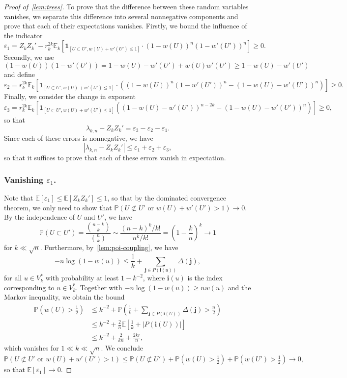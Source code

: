 \documentclass[11pt]{article}
\theoremstyle{definition}
\theoremstyle{remark}
\theoremstyle{remark}
\numberwithin{theorem}{section}
\providecommand{\P}{}
\renewcommand{\P}{\mathbb{P}}
\newcommand{\E}{\mathbb{E}}
\newcommand{\I}[1]{{\mathbf 1}_{[#1]}}
\begin{document}
\begin{proof}[Proof of~\cref{lem:trees}]
    To prove that the difference between these random variables vanishes, we separate this difference into several nonnegative components and prove that each of their expectations vanishes.
    Firstly, we bound the influence of the indicator
    \[
    \varepsilon_1=Z_kZ_k'-r_k^{2k}\E_k[\I{U\subset U',w(U)+w'(U')\le1}\cdot\left(1-w(U)\right)^n\left(1-w'(U')\right)^n]\ge0.
    \] 
    Secondly, we use \[(1-w(U))(1-w'(U'))=1-w(U)-w'(U')+w(U)w'(U')\ge1-w(U)-w'(U')\]
    and define
    \[
    \varepsilon_2=r_k^{2k}\E_k\left[\I{U\subset U',w(U)+w'(U')\le1}\cdot\left(\left(1-w(U)\right)^n\left(1-w'(U')\right)^n-\left(1-w(U)-w'(U')\right)^n\right)\right]\ge0.
    \]
    Finally, we consider the change in exponent
    \[
    \varepsilon_3=r_k^{2k}\E_k\left[\I{U\subset U',w(U)+w'(U')\le1}\left(\left(1-w(U)-w'(U')\right)^{n-2k}-\left(1-w(U)-w'(U')\right)^n\right)\right]\ge0,
    \]
    so that
    \[
    \lambda_{k,n}-Z_kZ_k'=\varepsilon_3-\varepsilon_2-\varepsilon_1.
    \]
    Since each of these errors is nonnegative, we have
    \[
    |\lambda_{k,n}-Z_kZ_k'|\le\varepsilon_1+\varepsilon_2+\varepsilon_3,
    \]
    so that it suffices to prove that each of these errors vanish in expectation.

    \subsubsection*{Vanishing $\varepsilon_1$.} 
    Note that $\E[\varepsilon_1]\le\E[Z_kZ_k']\le1$, so that by the dominated convergence theorem, we only need to show that $\P(U\not\subset U'\text{ or }w(U)+w'(U')>1)\to0$.
    By the independence of $U$ and $U'$, we have
    \[
        \P(U\subset U')=\frac{{n-k\choose k}}{{n\choose k}}\sim \frac{(n-k)^k/k!}{n^k/k!}=\left(1-\frac kn\right)^{k}\to1
    \]
    for $k\ll\sqrt{n}$.
    Furthermore, by~\cref{lem:poi-coupling}, we have
    \[
    -n\log(1-w(u))\le \frac1k+\sum_{\bm j\in P(\bm i(u))}\Delta(\bm j),
    \]
    for all $u\in V_k^*$ with probability at least $1-k^{-2}$, where $\bm i(u)$ is the index corresponding to $u\in V_k^*$. Together with $-n\log(1-w(u))\ge nw(u)$ and the Markov inequality, we obtain the bound
    \begin{align*}
    \P(w(U)>\tfrac12)&\le k^{-2}+\P\left(\frac1k+\sum_{\bm j\in P(\bm i(U))}\Delta(\bm j)>\frac n2\right)\\
    &\le k^{-2}+\frac2n\E\left[\frac1k+|P(\bm i(U))|\right]\\
    &\le k^{-2}+\frac2{kn}+\frac{2kr}n,
    \end{align*}
    which vanishes for $1\ll k\ll\sqrt{n}$.
    We conclude
    \[
    \P(U\not\subset U'\text{ or }w(U)+w'(U')>1)\le \P(U\not\subset U')+\P(w(U)>\tfrac12)+\P(w(U')>\tfrac12)\to0,
    \]
    so that $\E[\varepsilon_1]\to0$.

\end{proof}
\end{document}
